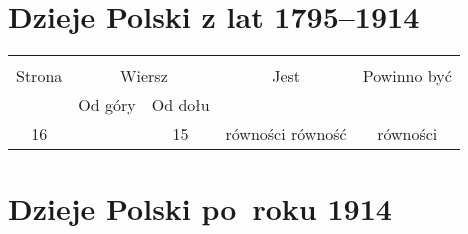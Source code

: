 \documentclass[a4paper,11pt]{article}
\begin{document}
\vspace{\spaceTwo}





\newpage
\section{Dzieje Polski z lat 1795--1914}

\vspace{\spaceTwo}





\begin{center}
  \begin{tabular}{|c|c|c|c|c|}
    \hline
    & \multicolumn{2}{c|}{} & & \\
    Strona & \multicolumn{2}{c|}{Wiersz} & Jest
                              & Powinno być \\ \cline{2-3}
    & Od góry & Od dołu & & \\
    \hline
    16 & & 15 & równości równość & równości \\
    \hline
  \end{tabular}
\end{center}

\vspace{\spaceTwo}





\newpage
\section{Dzieje Polski po~roku 1914}




\end{document}
